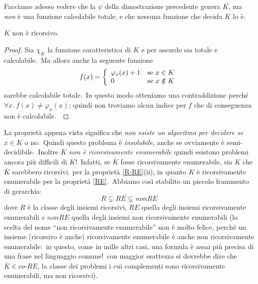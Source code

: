\noindent Facciamo adesso vedere che la $\psi$ della dimostrazione precedente genera $K$, ma \textit{non} è una funzione calcolabile totale, e che nessuna funzione che decida $K$ lo è.\

\begin{property}
    \label{K_notRec}
    $K$ non è ricorsivo.\
\end{property}

\begin{proof}
    Sia $\chi_K$ la funzione caratteristica di $K$ e per assurdo sia totale e calcolabile.\
    Ma allora anche la seguente funzione
    \[f(x)=\left\{\begin{array}{l l}
            \varphi_x(x) + 1 & \mathrm{se}\ x \in K    \\
            0                & \mathrm{se}\ x \notin K \\
        \end{array}\right.\]
    sarebbe calcolabile totale.\
    In questo modo otteniamo una contraddizione perché $\forall x.\ f(x) \neq \varphi_x(x)$; quindi non troviamo alcun indice per $f$ che di conseguenza non è calcolabile.\
\end{proof}

\noindent La proprietà appena vista significa che \textit{non esiste un algoritmo per decidere se} $x \in K$ o no.\
Quindi questo problema è \textit{insolubile}, anche se ovviamente è semi-decidibile.\
Inoltre $\overline{K}$ \textit{non è ricorsivamente enumerabile} quindi esistono problemi ancora più difficili di $K$!\
Infatti, se $\overline{K}$ fosse ricorsivamente enumerabile, sia $K$ che $\overline{K}$ sarebbero ricorsivi, per la proprietà \ref{R-RE}(ii), in quanto $K$ è ricorsivamente enumerabile per la proprietà \ref{RE}.\
Abbiamo così stabilito un piccolo frammento di gerarchia:
\[R\subsetneq RE \subsetneq \mathit{non}RE\]
dove $R$ è la classe degli insiemi ricorsivi, $RE$ quella degli insiemi ricorsivamente enumerabili e $\mathit{non}RE$ quella degli insiemi non ricorsivamente enumerabili (la scelta del nome ``non ricorsivamente enumerabile'' non è molto felice, perché un insieme (ricorsivo è anche) ricorsivamente enumerabile è anche non ricorsivamente enumerabile:\ in questo, come in mille altri casi, una formula è assai più precisa di una frase nel linguaggio comune!\ con maggior esattezza si dovrebbe dire che $\overline{K} \in \mathit{co\textrm{-}}RE$, la classe dei problemi i cui complementi sono ricorsivamente enumerabili, ma non ricorsivi).

\vspace{12pt}


